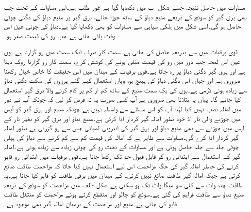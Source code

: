 مساوات  میں حاصل نتیجہ جسے شکل -ب میں دکھایا گیا  ہے غور طلب ہے۔اس مساوات کے تحت جب بھی برق گیر کو سوئچ کے ذریعے منبع دباؤ کے ساتھ جوڑا جائے، برق گیر پر منبع دباؤ کی دگنی چوٹی حاصل ہو گی۔اسی شکل میں ہلکی سیاہی سے مساوات  کو بھی دکھایا گیا ہے۔دباؤ کی چوٹی عین اس وقت پائی جاتی ہے جب رو کی قیمت صفر ہو۔

قوی برقیات میں  سے  بذریعہ  حاصل کی جاتی ہے۔سمت کار صرف ایک سمت میں رو گزارتا ہے۔یوں عین اس لمحہ جب دور میں رو کی قیمت منفی ہونے کی کوشش کرے، سمت کار رو گزارنا روک دیتا ہے اور برق گیر دگنی دباؤ پر رہ جاتا ہے۔قوی برقیات کے میدان میں اس حقیقت کا خاص خیال رکھنا ضروری ہے اور جہاں اس دگنی دباؤ کی پہنچ ہو، وہاں استعمال کیے گئے پرزوں کی سکت دگنی دباؤ سے زیادہ ہونی لازمی ہے۔یوں  کی یک سمت منبع کے ساتھ کم از کم  پر کام کرنے والا برق گیر استعمال کیا جائے گا۔ یہاں یہ بتلانا بھی ضروری ہے آپ کسی صورت یہ نہ فرض کر لیں کہ چونکہ آپ نے دور میں امالہ نصب نہیں کیا لہٰذا آپ کو اس مسئلے سے واسطہ نہیں ہے چونکہ منبع اور برق گیر کو آپس میں جوڑنے والی تار اذ خود بطور امالہ گیر کردار ادا کرتی ہے۔منبع دباؤ اور برق گیر کو بغیر تار کے آپس میں جوڑنے سے بھی منبع دباؤ اور برق گیر کی اندرونی لمبائی جس سے رو گزرتی ہے بطور امالہ گیر کردار ادا کرے گی۔مساوات  سے ظاہر ہے کہ امالہ کی قیمت کم سے کم کرنے سے دباؤ کی پہلی چوٹی جلد سے جلد حاصل ہوتی ہے اور مساوات  کے تحت  رو کی چوٹی زیادہ سے زیادہ ہوتی ہے۔امالہ گیر کے استعمال سے ابتدائی رو کو قابل قبول حد تک رکھا جاتا ہے۔قوی برقیات میں ابتدائی رو قابو کرنے کی خاطر امالہ گیر کی جگہ مزاحمت اس لیے استعمال نہیں کیا جاتا کہ مزاحمت طاقت ضائع کرتی ہے جبکہ امالہ گیر طاقت ضائع نہیں کرتی۔
 کے میدان میں برقی طاقت کو قابو کیا جاتا ہے۔یہ طاقت چند واٹ  سے کئی سو میگا واٹ  تک ہو سکتی ہے۔شکل -الف میں مزاحمت  کو سوئچ کے ذریعہ منبع دباؤ سے طاقت فراہم کی گئی ہے۔سوئچ کو چالو اور منقطع کرتے ہوئے مزاحمت کو منتقل طاقت قابو کی جاتی ہے۔منبع اور مزاحمت کے درمیان امالہ گیر بھی موجود ہے۔


